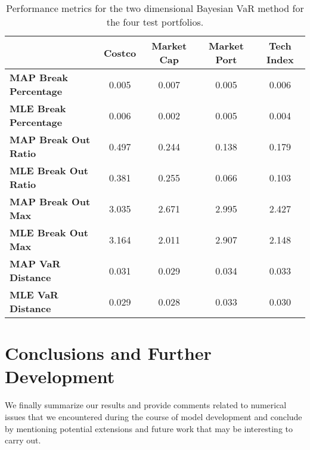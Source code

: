 \documentclass{amsart}
\begin{document}
\begin{table} 
    \centering
    \begin{normalsize}\begin{tabular}{|l|c|c|c|c|}
\hline
&\textbf{Costco}&\textbf{Market Cap}&\textbf{Market Port}&\textbf{Tech Index}\\\hline
\textbf{MAP Break Percentage}&0.005&0.007&0.005&0.006\\\hline
\textbf{MLE Break Percentage}&0.006&0.002&0.005&0.004\\\hline
\textbf{MAP Break Out Ratio}&0.497&0.244&0.138&0.179\\\hline
\textbf{MLE Break Out Ratio}&0.381&0.255&0.066&0.103\\\hline
\textbf{MAP Break Out Max}&3.035&2.671&2.995&2.427\\\hline
\textbf{MLE Break Out Max}&3.164&2.011&2.907&2.148\\\hline
\textbf{MAP VaR Distance}&0.031&0.029&0.034&0.033\\\hline
\textbf{MLE VaR Distance}&0.029&0.028&0.033&0.030\\\hline
\end{tabular}
\end{normalsize}
\hspace{10pt}
\caption{Performance metrics for the two dimensional Bayesian VaR method for the four 
test portfolios.}
\label{tab2}
\end{table}

\section{Conclusions and Further Development}   


We finally summarize our results and provide comments related to numerical issues 
that we encountered during the course of model development and 
conclude by mentioning potential extensions and future work that may be interesting 
to carry out.
\end{document}
